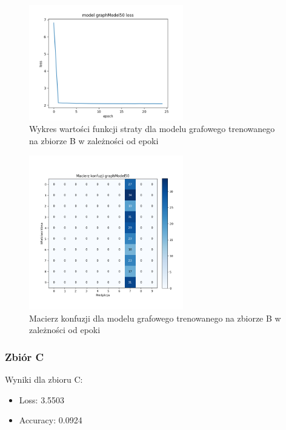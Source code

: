 \documentclass{article}
\begin{document}
\begin{figure}[H]
    \centering
    \includegraphics[width=0.6\textwidth]{img/graphModel50_loss.png}
    \caption{Wykres wartości funkcji straty dla modelu grafowego trenowanego na zbiorze B w zależności od epoki} 
\end{figure}

\begin{figure}[H]
    \centering
    \includegraphics[width=0.6\textwidth]{img/graphModel50_confusion.png}
    \caption{Macierz konfuzji dla modelu grafowego trenowanego na zbiorze B w zależności od epoki} 
\end{figure}

\subsubsection{Zbiór C}

Wyniki dla zbioru C:
\begin{itemize}
    \item Loss: 3.5503
    \item Accuracy: 0.0924
\end{itemize}
\end{document}
